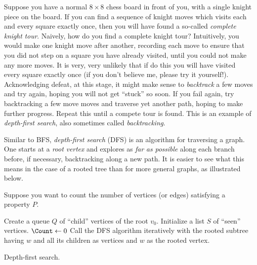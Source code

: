 Suppose you have a normal $8 \times 8$ chess board in front of you,
with a single knight piece on the board. If you can find a sequence of
knight moves which visits each and every square exactly once, then you
will have found a so-called \emph{complete knight tour}.
Naively, how do you find a complete knight tour? Intuitively, you
would make one knight move after another, recording each move to
ensure that you did not step on a square you have already visited,
until you could not make any more moves. It is very, very unlikely
that if do this you will have visited every square exactly once (if
you don't believe me, please try it yourself!). Acknowledging defeat,
at this stage, it might make sense to \emph{backtrack} a few moves and
try again, hoping you will not get ``stuck'' so soon. If you fail
again, try backtracking a few move moves and traverse yet another
path, hoping to make further progress. Repeat this until a compete
tour is found. This is an example of \emph{depth-first search}, also
sometimes called \emph{backtracking}.

Similar to BFS, \emph{depth-first search} (DFS) is an algorithm for
traversing a graph. One starts at a \emph{root vertex} and explores as
\emph{far as possible} along each branch before, if necessary,
backtracking along a new path. It is easier to see what this means in
the case of a rooted tree than for more general graphs, as illustrated
below.

Suppose you want to count the number of vertices (or edges) satisfying
a property $P$.

\begin{algorithm}[!htpb]
\dontprintsemicolon  %
\BlankLine
Create a queue $Q$ of ``child'' vertices of the root $v_0$.\;
Initialize a list $S$ of ``seen'' vertices.\;
$\Count \leftarrow 0$\;
Call the DFS algorithm iteratively with the rooted subtree having $w$
and all its children as vertices and $w$ as the rooted vertex.
\caption{Depth-first search.}
\label{alg:graph_algorithms:depth_first_search}
\end{algorithm}

